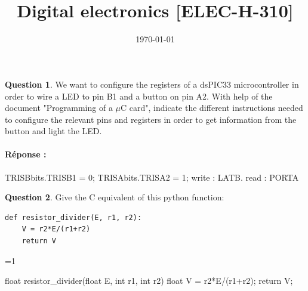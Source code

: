 \documentclass[11pt,a4paper,dvipsnames]{article}
\date{\vspace{-1.7cm}\mydate\today}
\title{\vspace{-2cm} \tpnumber \\ Digital electronics [ELEC-H-310] \ifthenelse{\boolean{corrige}}{~\\Corrigé}{}}
\theoremstyle{definition}%
\newtheorem{Q}{Question}[] %
\newcommand{\reponse}[1]{%
	\ifthenelse {\boolean{corrige}} {\paragraph{Réponse :}
    \color{darkblue} #1 \color{black}} {}
 }
\newcounter{reponseCnt}
\begin{document}
 {\setcounter{reponseCnt}{1}} {\setcounter{reponseCnt}{0}}
\pagestyle{empty}
\maketitle
\vspace*{-1cm}

\begin{Q}
We want to configure the registers of a dsPIC33 microcontroller in order to wire a LED to pin B1 and a button on pin A2.
With help of the document "Programming of a $\mu$C card", indicate the different instructions needed to
configure the relevant pins and registers in order to get information from the button and light the LED.

\reponse{
TRISBbits.TRISB1 = 0;
TRISAbits.TRISA2 = 1;
write : LATB.
read : PORTA

}
\end{Q}

\begin{Q}
Give the C equivalent of this python function:
\begin{verbatim}
def resistor_divider(E, r1, r2):
    V = r2*E/(r1+r2)
    return V
\end{verbatim}

\ifnum\value{reponseCnt}=1
  \begin{uC}
    float resistor_divider(float E, int r1, int r2) {
      float V = r2*E/(r1+r2);
      return V;
    }
  \end{uC}
\fi
\end{Q}
\end{document}

